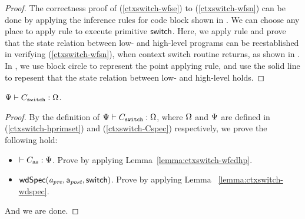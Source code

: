 \begin{proof}
    The correctness proof of
    (\ref{ctxswitch-wfse}) to (\ref{ctxswitch-wfsn}) 
    can be done by applying the inference rules for 
    code block shown in 
    \Fig{\ref{fig:Selected Inference Rules for Refinement Verification}}. 
    We can choose any place to apply 
     rule to execute primitive $\mathsf{switch}$. 
    Here, we apply  rule 
    and prove that the state 
    relation between low- and high-level programs 
    can be reestablished in verifying 
    (\ref{ctxswitch-wfsn}), when context switch routine 
    returns, as shown in \Fig{\ref{fig:refinement reasoning}}.
    In \Fig{\ref{fig:refinement reasoning}}, we use block 
    circle to represent the point applying  rule, 
    and use the solid line to repesent that the state relation 
    between low- and high-level holds. 
\end{proof}

\begin{theorem}
    \em
    ${\Psi} \vdash {C_{\texttt{switch}}} : {\Omega}$. 
\end{theorem}
\begin{proof}
    By the definition of 
    ${\Psi} \vdash {C_{\texttt{switch}}} : {\Omega}$, 
    where $\Omega$ and $\Psi{}$ are defined in 
    (\ref{ctxswitch-hprimset}) and (\ref{ctxswitch-Cspec}) 
    respectively, we prove the following hold:
    \begin{itemize}
        \item $\vdash {C_{\text{as}}} : {\Psi{}}$. 
            Prove by applying Lemma~\ref{lemma:ctxswitch-wfcdhp}.
        \item $\textsf{wdSpec}({\textit{a}_\textit{pre}}, {\mathsf{a}_{\textit{post}}}, {\mathsf{switch}})$.
            Prove by applying Lemma ~\ref{lemma:ctxswitch-wdspec}.
    \end{itemize}
    And we are done.
\end{proof}

